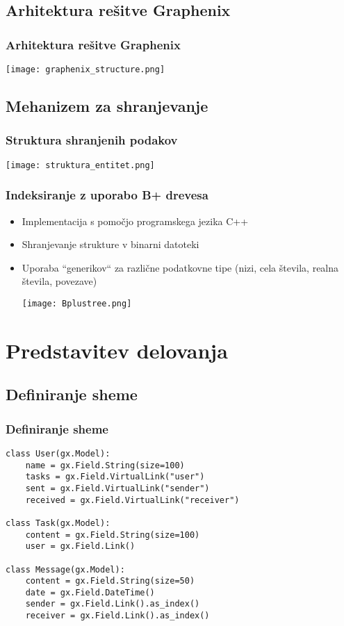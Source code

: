 \documentclass{beamer}
\begin{document}
    \subsection{Arhitektura rešitve Graphenix}
    \begin{frame}
    \frametitle{Arhitektura rešitve Graphenix}
        \centering
        \texttt{[image: graphenix\_structure.png]}
    \end{frame}

    \subsection{Mehanizem za shranjevanje}
    \begin{frame}
    \frametitle{Struktura shranjenih podakov}
        \centering
        \texttt{[image: struktura\_entitet.png]}
    \end{frame}

    \begin{frame}
    \frametitle{Indeksiranje z uporabo B+ drevesa}
    \begin{itemize}
        \item Implementacija s pomočjo programskega jezika C++
        \item Shranjevanje strukture v binarni datoteki
        \item Uporaba ``generikov`` za različne podatkovne tipe (nizi, cela števila, realna števila, povezave)
        
        \centering
        \texttt{[image: Bplustree.png]}
    \end{itemize}
    \end{frame}

\section{Predstavitev delovanja}
    \subsection{Definiranje sheme}
    \begin{frame}[fragile]
    \frametitle{Definiranje sheme}
    \footnotesize
        \begin{verbatim}
class User(gx.Model):
    name = gx.Field.String(size=100)
    tasks = gx.Field.VirtualLink("user")
    sent = gx.Field.VirtualLink("sender")
    received = gx.Field.VirtualLink("receiver")
    
class Task(gx.Model):
    content = gx.Field.String(size=100)
    user = gx.Field.Link()
    
class Message(gx.Model):
    content = gx.Field.String(size=50)
    date = gx.Field.DateTime()
    sender = gx.Field.Link().as_index()
    receiver = gx.Field.Link().as_index()
        \end{verbatim}
    \end{frame}
\end{document}
